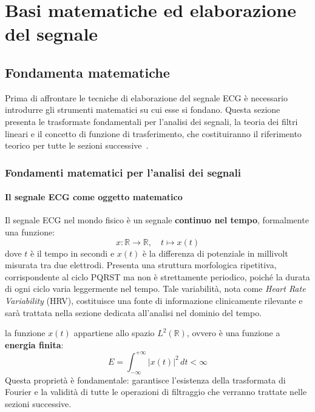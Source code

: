 \chapter{Basi matematiche ed elaborazione del segnale}

\section{Fondamenta matematiche}

Prima di affrontare le tecniche di elaborazione del segnale ECG è necessario introdurre gli strumenti matematici su cui esse si fondano. Questa sezione presenta le trasformate fondamentali per l'analisi dei segnali, la teoria dei filtri lineari e il concetto di funzione di trasferimento, che costituiranno il riferimento teorico per tutte le sezioni successive~\cite{oppenheim1996signals, oppenheim1997dsp}.

\subsection{Fondamenti matematici per l'analisi dei segnali}

\subsubsection{Il segnale ECG come oggetto matematico}
Il segnale ECG nel mondo fisico è un segnale \textbf{continuo nel tempo}, formalmente una funzione:
\[
x : \mathbb{R} \to \mathbb{R}, \quad t \mapsto x(t)
\]
dove $t$ è il tempo in secondi e $x(t)$ è la differenza di potenziale in millivolt misurata tra due elettrodi. Presenta una struttura morfologica ripetitiva, corrispondente al ciclo PQRST ma non è strettamente periodico, poiché la durata di ogni ciclo varia leggermente nel tempo. Tale variabilità, nota come \textit{Heart Rate Variability} (HRV), costituisce una fonte di informazione clinicamente rilevante e sarà trattata nella sezione dedicata all'analisi nel dominio del tempo.

la funzione $x(t)$ appartiene allo spazio $L^2(\mathbb{R})$, ovvero è una funzione a \textbf{energia finita}:
\[
E = \int_{-\infty}^{+\infty} |x(t)|^2 \, dt < \infty
\]
Questa proprietà è fondamentale: garantisce l'esistenza della trasformata di Fourier e la validità di tutte le operazioni di filtraggio che verranno trattate nelle sezioni successive.

